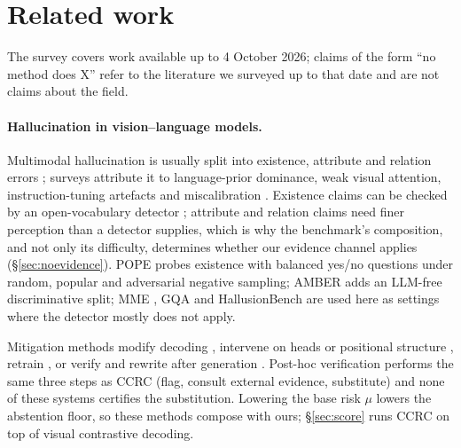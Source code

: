 \section{Related work}
\label{sec:related}

The survey covers work available up to 4 October 2026; claims of the form ``no method does X'' refer
to the literature we surveyed up to that date and are not claims about the field.

\paragraph{Hallucination in vision--language models.}
Multimodal hallucination is usually split into existence, attribute and relation errors
\citep{amber}; surveys \citep{bai2024survey,liu2024survey,ji2023} attribute it to language-prior
dominance, weak visual attention, instruction-tuning artefacts \citep{liu2023lrv} and
miscalibration \citep{guo2017}. Existence claims can be checked by an open-vocabulary detector
\citep{owlv2,liu2024groundingdino}; attribute and relation claims need finer perception than a
detector supplies, which is why the benchmark's composition, and not only its difficulty,
determines whether our evidence channel applies (\S\ref{sec:noevidence}). POPE \citep{pope}
probes existence with balanced yes/no questions under random, popular and adversarial negative
sampling; AMBER \citep{amber} adds an LLM-free discriminative split; MME \citep{mme}, GQA
\citep{gqa} and HallusionBench \citep{hallusionbench} are used here as settings where the detector
mostly does not apply.

Mitigation methods modify decoding \citep{opera,vcd,chen2024halc,favero2024,degf,marine},
intervene on heads or positional structure \citep{attnlens,only,maskcd,causalgating,mcallava},
retrain \citep{sun2024aligning,yu2024rlhfv,liu2023lrv}, or verify and rewrite after generation
\citep{woodpecker,lure,reverse,mkgrag,rule,cmvkgguard}. Post-hoc verification performs the same
three steps as CCRC (flag, consult external evidence, substitute) and none of these systems
certifies the substitution. Lowering the base risk $\mu$ lowers the abstention floor, so these
methods compose with ours; \S\ref{sec:score} runs CCRC on top of visual contrastive decoding.

